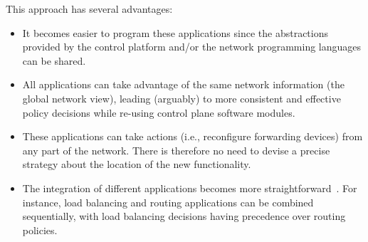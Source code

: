 This approach has several advantages:
\begin{itemize}
\item It becomes easier to program these applications since the abstractions provided by the 
control platform and/or the network programming languages can be shared.
\item All applications can take advantage of the same network information (the global network view), 
leading (arguably) to more consistent and effective policy decisions while re-using control plane 
software modules.
\item These applications can take actions (i.e., reconfigure forwarding devices) from any part of 
the network. There is therefore no need to devise a precise strategy about the location of the new 
functionality.
\item The integration of different applications becomes more straightforward~\cite{Casado2014_4}. For instance, load 
balancing and routing applications can be combined sequentially, with load balancing decisions having 
precedence over routing policies.
\end{itemize}
